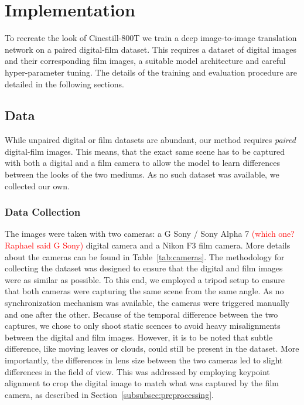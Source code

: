 \section{Implementation}
\label{sec:implementation}


To recreate the look of Cinestill-800T we train a deep image-to-image
translation network on a paired digital-film dataset. This requires a dataset of
digital images and their corresponding film images, a suitable model
architecture and careful hyper-parameter tuning. The details of the training and evaluation procedure are detailed in the
following sections.


\subsection{Data}
\label{subsec:data}

While unpaired digital or film datasets are abundant, our method requires
\textit{paired} digital-film images. This means, that the exact same scene has
to be captured with both a digital and a film camera to allow the model to learn
differences between the looks of the two mediums. As no such dataset was available, we collected our own.

\subsubsection{Data Collection}
\label{subsubsec:data-collection}

The images were taken with two cameras: a G Sony / Sony Alpha 7 \textcolor{red}{(which one? Raphael said G Sony)} digital camera and a Nikon F3 film camera. More details about the cameras can be found in Table~\ref{tab:cameras}. The methodology for collecting the dataset was designed to ensure that the digital and film images were as similar as possible. To this end, we employed a tripod setup to ensure that both cameras were capturing the same scene from the same angle. As no synchronization mechanism was available, the cameras were triggered manually and one after the other. Because of the temporal difference between the two captures, we chose to only shoot static scences to avoid heavy misalignments between the digital and film images. However, it is to be noted that subtle difference, like moving leaves or clouds, could still be present in the dataset. More importantly, the differences in lens size between the two cameras led to slight differences in the field of view. This was addressed by employing keypoint alignment to crop the digital image to match what was captured by the film camera, as described in Section~\ref{subsubsec:preprocessing}.

